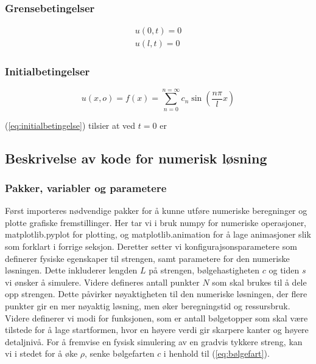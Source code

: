 \subsubsection{Grensebetingelser}

\begin{align}
	u(0 , t) = 0 \label{eq:grensebetingelse0}\\
	u(l , t) = 0 \label{eq:grensebetingelsel}
\end{align}

\subsubsection{Initialbetingelser}

\begin{equation}
	u(x , o) = f(x) = \sum_{n=0}^{n=\infty} c_n \sin \left( \frac{n \pi}{l} x \right) 	
	\label{eq:initialbetingelse}
\end{equation}

(\ref{eq:initialbetingelse}) tilsier at ved $t=0$ er 




\subsection{Beskrivelse av kode for numerisk løsning}
\subsubsection{Pakker, variabler og parametere}
Først importeres nødvendige pakker for å kunne utføre numeriske beregninger og plotte grafiske fremstillinger. Her
tar vi i bruk numpy for numeriske operasjoner, matplotlib.pyplot for plotting, og matplotlib.animation for å lage 
animasjoner slik som forklart i forrige seksjon. Deretter setter vi konfigurajsonsparametere som definerer
fysiske egenskaper til strengen, samt parametere for den numeriske løsningen. Dette inkluderer lengden $L$ på strengen,
bølgehastigheten $c$ og tiden $s$ vi ønsker å simulere. Videre defineres antall punkter $N$ som skal brukes til å dele 
opp strengen. Dette påvirker nøyaktigheten til den numeriske løsningen, der flere punkter gir en mer nøyaktig løsning,
men øker beregningstid og ressursbruk. Videre definerer vi modi for funksjonen, som er antall bølgetopper som skal være 
tilstede for å lage startformen, hvor en høyere verdi gir skarpere kanter og høyere detaljnivå. \parencite{bølgeSimulering} 
For å fremvise en fysisk simulering av en gradvis tykkere streng, kan vi i stedet for å øke $\rho$, senke bølgefarten $c$ i 
henhold til (\ref{eq:bølgefart}).

